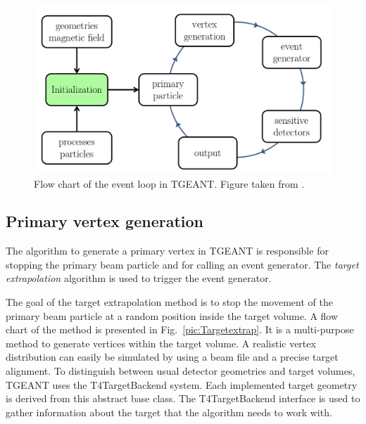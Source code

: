 \begin{figure}[!h]
  \centering
	\includegraphics[scale=0.5]{./gfx/EventLoop.png}
	\caption{Flow chart of the event loop in TGEANT. Figure taken from \cite{Tobias}.}
	\label{pic:EventLoop}
\end{figure}

\subsection{Primary vertex generation}

The algorithm to generate a primary vertex in TGEANT is responsible for stopping the primary beam particle and for calling an event generator. The \textit{target extrapolation} algorithm is used to trigger the event generator.

The goal of the target extrapolation method is to stop the movement of the primary beam particle at a random position inside the target volume. A flow chart of the method is presented in Fig.~\ref{pic:Targetextrap}. It is a multi-purpose method to generate vertices within the target volume. A realistic vertex distribution can easily be simulated by using a beam file and a precise target alignment.
To distinguish between usual detector geometries and target volumes, TGEANT uses the T4TargetBackend system. Each implemented target geometry is derived from this abstract base class. The T4TargetBackend interface is used to gather information about the target that the algorithm needs to work with.

